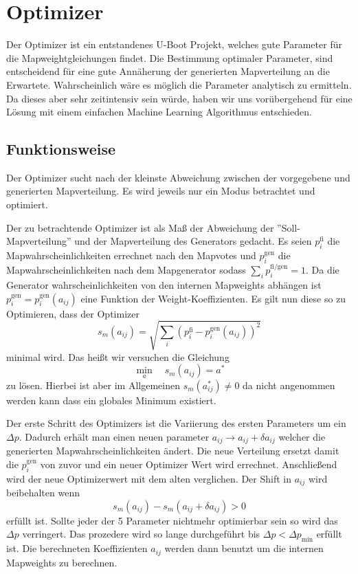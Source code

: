 \section{Optimizer}
Der Optimizer ist ein entstandenes U-Boot Projekt, welches gute Parameter für  die Mapweightgleichungen  findet.
Die Bestimmung optimaler Parameter, sind entscheidend für eine gute Annäherung der generierten Mapverteilung an die Erwartete.
Wahrscheinlich wäre es möglich die Parameter analytisch zu ermitteln. Da dieses aber sehr zeitintensiv sein würde, 
haben wir uns vorübergehend für eine Lösung mit einem einfachen \glqq{}Machine Learning\grqq{} Algorithmus entschieden. 
\subsection{Funktionsweise}
Der Optimizer sucht nach der kleinste Abweichung zwischen der vorgegebene und generierten Mapverteilung. 
Es wird jeweils nur ein Modus betrachtet und optimiert.

Der zu betrachtende Optimizer ist als Maß der Abweichung der ''Soll-Mapverteilung'' und der Mapverteilung des Generators gedacht. 
Es seien $p_i^\text{fi}$ die Mapwahrscheinlichkeiten errechnet nach den Mapvotes und $p_i^\text{gen}$ die Mapwahrscheinlichkeiten nach dem Mapgenerator sodass $\sum_i p_i^\text{fi/gen}=1$.
Da die Generator wahrscheinlichkeiten von den internen Mapweights abhängen ist $p_i^\text{gen}=p_i^\text{gen}(a_{ij})$ eine Funktion der Weight-Koeffizienten. 
Es gilt nun diese so zu Optimieren, dass der Optimizer 
\begin{equation}
    s_m(a_{ij}) = \sqrt{\sum_i \left(p_i^\text{fi}-p_i^\text{gen}(a_{ij})\right)^2}
\end{equation}
minimal wird. 
Das heißt wir versuchen die Gleichung 
\begin{equation}
    \underset{a}{\min}\quad s_m(a_{ij}) = a^*
\end{equation}
zu lösen. 
Hierbei ist aber im Allgemeinen $s_m(a^*_{ij}) \neq 0$ da nicht angenommen werden kann dass ein globales Minimum existiert. 

Der erste Schritt des Optimizers ist die Variierung des ersten Parameters um ein $\varDelta p$.
Dadurch erhält man einen neuen parameter $a_{ij} \rightarrow a_{ij} + \delta a_{ij}$ welcher die generierten Mapwahrscheinlichkeiten ändert.
Die neue Verteilung ersetzt damit die $p_i^\text{gen}$ von zuvor und ein neuer Optimizer Wert wird errechnet. 
Anschließend wird der neue Optimizerwert mit dem alten verglichen. 
Der Shift in $a_{ij}$ wird beibehalten wenn 
\begin{equation}
    s_m(a_{ij}) - s_m(a_{ij}+\delta a_{ij}) > 0 
\end{equation}
erfüllt ist. 
Sollte jeder der 5 Parameter nichtmehr optimierbar sein so wird das $\varDelta p$ verringert.
Das prozedere wird so lange durchgeführt bis $\varDelta p < \varDelta p_\text{min}$ erfüllt ist. 
Die berechneten Koeffizienten $a_{ij}$ werden dann benutzt um die internen Mapweights zu berechnen.

